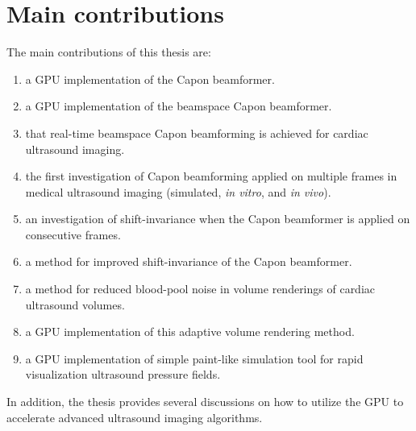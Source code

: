 \section{Main contributions}
The main contributions of this thesis are:
\begin{enumerate}
\item a GPU implementation of the Capon beamformer.
\item a GPU implementation of the beamspace Capon beamformer.
\item that real-time beamspace Capon beamforming is achieved for cardiac ultrasound imaging.
\item the first investigation of Capon beamforming applied on multiple frames in medical ultrasound imaging (simulated, \textit{in vitro}, and \textit{in vivo}).
\item an investigation of shift-invariance when the Capon beamformer is applied on consecutive frames.
\item a method for improved shift-invariance of the Capon beamformer.
\item a method for reduced blood-pool noise in volume renderings of cardiac ultrasound volumes.
\item a GPU implementation of this adaptive volume rendering method.
\item a GPU implementation of simple paint-like simulation tool for rapid visualization ultrasound pressure fields.
\end{enumerate}
In addition, the thesis provides several discussions on how to utilize the GPU to accelerate advanced ultrasound imaging algorithms. 

